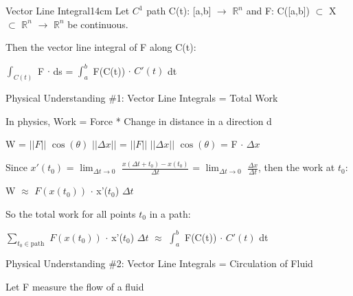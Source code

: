     \begin{definition}{Vector Line Integral}{14cm}
        Let $C^1$ path C(t): [a,b] $\rightarrow$ $\mathbb{R}^n$
        and F: C([a,b]) $\subset$ X $\subset$ $\mathbb{R}^n$ $\rightarrow$
        $\mathbb{R}^n$ be continuous.

        Then the {\color{lblue} vector line integral}
        of F along C(t):

        \hspace{0.5cm}
        $\int_{C(t)}$ F $\cdot$ ds = $\int_a^b$ F(C(t)) $\cdot$ $C'(t)$ dt

        \vspace{0.3cm}



        {\color{red} Physical Understanding \#1:
        Vector Line Integrals = Total Work}

        \hspace{0.5cm}
        \begin{minipage}{13.5cm}
            In physics, Work = Force * Change in distance in a direction d

            \hspace{0.5cm}
            W = $||F||$ $\cos(\theta)$ $||\Delta x||$ 
            = $||F||$ $||\Delta x||$ $\cos(\theta)$
            = F $\cdot$ $\Delta x$

            Since $x'(t_0)$
            = $\lim_{\Delta t \rightarrow 0}$
                $\frac{x(\Delta t + t_0) - x(t_0)}{\Delta t}$
            = $\lim_{\Delta t \rightarrow 0}$
                $\frac{\Delta x}{\Delta t}$, then the work at $t_0$:

            \hspace{0.5cm}
            W $\approx$ $F(x(t_0))$ $\cdot$ x'($t_0$) $\Delta t$

            So the total work for all points $t_0$ in a path:

            \hspace{0.5cm}
            $\sum_{t_0 \in \text{path}}$ $F(x(t_0))$ $\cdot$ x'($t_0$) $\Delta t$
            $\approx$ $\int_a^b$ F(C(t)) $\cdot$ $C'(t)$ dt
        \end{minipage}

        \vspace{0.3cm}



        {\color{red} Physical Understanding \#2:
        Vector Line Integrals = Circulation of Fluid}

        \hspace{0.5cm}
        \begin{minipage}{13.5cm}
            Let F measure the flow of a fluid


\end{minipage}
\end{definition}
